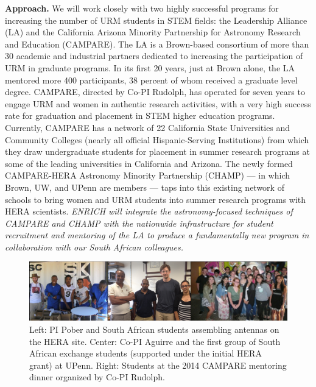 \documentclass[preprint,11pt]{aastex}
\begin{document}
\textbf{Approach.} We will work closely with two highly successful programs for increasing the number of URM students in STEM fields: the Leadership Alliance (LA) and the California Arizona Minority Partnership for Astronomy Research and Education (CAMPARE).
The LA is a Brown-based consortium of more than 30 academic and industrial partners
dedicated to increasing the participation of URM in graduate programs.
In its first 20 years, just at Brown alone, the LA mentored more 400 participants, 38 percent of whom received a graduate level degree. CAMPARE, directed by Co-PI Rudolph, has operated for seven years to engage URM and women in authentic research activities, with a very high success rate for graduation and placement in STEM higher education programs.  Currently, CAMPARE has a network of 22 California State Universities and Community Colleges (nearly all official Hispanic-Serving Institutions) from which they draw undergraduate students for placement in summer research programs at some of the leading universities in California and Arizona.  The newly formed CAMPARE-HERA Astronomy Minority Partnership (CHAMP) --- in which Brown, UW, and UPenn are members --- 
taps into this existing network of schools to bring women and URM students into summer research programs with HERA scientists.
\emph{ENRICH will integrate the astronomy-focused techniques of CAMPARE and CHAMP with the nationwide infrastructure for student recruitment and mentoring of the LA to produce a fundamentally new program in collaboration with our South African colleagues.} 

\begin{figure}[!ht]
\centering
\includegraphics{education_fig.pdf}
\caption{Left: PI Pober and South African students assembling antennas on the HERA site.  Center: Co-PI Aguirre and the first group of South African exchange students (supported under the initial HERA grant) at UPenn.  Right: Students at the 2014 CAMPARE mentoring dinner organized by Co-PI Rudolph.}
\label{fig:education}
\vspace{-0.2in}
\end{figure}
\end{document}
